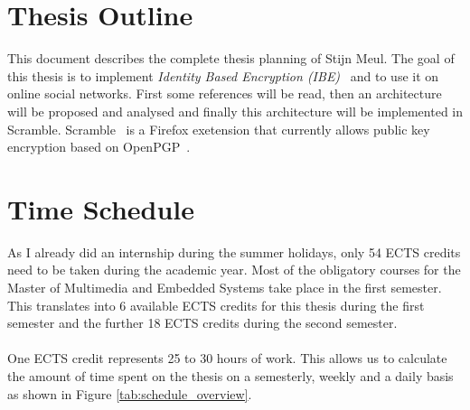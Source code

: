 \documentclass[12pt]{article}
\begin{document}
 
\maketitle 
\section*{Thesis Outline}
This document describes the complete thesis planning of Stijn Meul. The goal of this thesis is to implement \textit{Identity Based Encryption (IBE)}~\cite{DBLP:conf/crypto/Shamir84} and to use it on online social networks. First some references will be read, then an architecture will be proposed and analysed and finally this architecture will be implemented in Scramble. Scramble~\cite{DBLP:conf/pet/BeatoKW11} is a Firefox exetension that currently allows public key encryption based on OpenPGP~\cite{rfc4880}.
\section*{Time Schedule}
As I already did an internship during the summer holidays, only 54 ECTS credits need to be taken during the academic year. Most of the obligatory courses for the Master of Multimedia and Embedded Systems take place in the first semester. This translates into 6 available ECTS credits for this thesis during the first semester and the further 18 ECTS credits during the second semester.\\
\\
One ECTS credit represents 25 to 30 hours of work. This allows us to calculate the amount of time spent on the thesis on a semesterly, weekly and a daily basis as shown in Figure \ref{tab:schedule_overview}.\\
\end{document}
